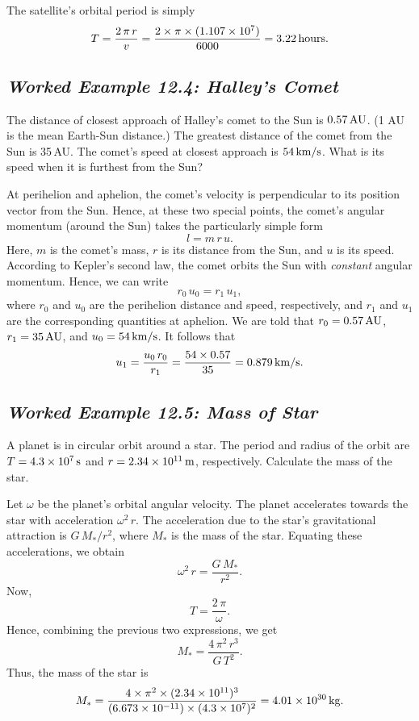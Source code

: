 The satellite's orbital period is simply
$$
T = \frac{2\,\pi\,r}{v} = \frac{2\times\pi\times (1.107\times 10^7)}{6000} = 3.22\,{\rm hours}.
$$

\subsection*{\em Worked Example 12.4: Halley's Comet}
 The distance of closest approach of Halley's comet to the
Sun is $0.57\,{\rm AU}$. (1 AU is the mean Earth-Sun distance.) The greatest
distance of the comet from the Sun is 35\,AU. The comet's speed at closest approach
is $54\,{\rm km/s}$. What is its speed when it is furthest from the Sun?

 At perihelion and aphelion, the comet's velocity is
perpendicular to its position vector from the Sun. Hence, at these two
special points, the comet's angular momentum (around the Sun) takes the particularly
simple form
$$
l = m\,r\,u.
$$
Here, $m$ is the comet's mass, $r$ is its distance from the Sun, and $u$ is its speed.
According to Kepler's second law, the comet orbits the Sun with {\em constant} angular
momentum. Hence, we can write
$$
r_0\,u_0 = r_1\,u_1,
$$
where $r_0$ and $u_0$ are the perihelion distance and speed, respectively, and $r_1$ and $u_1$
are the corresponding quantities at aphelion. We are told that $r_0=0.57\,{\rm AU}$, $r_1=35\,{\rm AU}$,
and $u_0 = 54\,{\rm km/s}$. It follows that
$$
u_1 = \frac{u_0\,r_0}{r_1} = \frac{54\times 0.57}{35} = 0.879\,{\rm km/s}.
$$

\subsection*{\em Worked Example 12.5: Mass of Star}
 A planet is in circular orbit around a star. The
period and radius of the orbit are $T= 4.3\times 10^7\,{\rm s}$ and  $r=2.34\times 10^{11}\,{\rm m}$,
respectively. Calculate the mass of the star.

 Let $\omega$ be the planet's orbital angular velocity. The
planet accelerates towards the star with acceleration $\omega^2\,r$. The acceleration
due to the star's gravitational attraction is $G\,M_\ast/r^2$, where $M_\ast$ is the
mass of the star. Equating these accelerations, we obtain
$$
\omega^2\,r = \frac{G\,M_\ast}{r^2}.
$$
Now,
$$
T = \frac{2\,\pi}{\omega}.
$$
Hence,
combining the previous two expressions, we get
$$
M_\ast = \frac{4\,\pi^2\,r^3}{G\,T^2}.
$$
Thus, the mass of the star is
$$
M_\ast = \frac{4\times\pi^2\times (2.34\times 10^{11})^3}{(6.673\times 10^{-11})\times
(4.3\times 10^7)^2} = 4.01\times 10^{30}\,{\rm kg}.
$$

